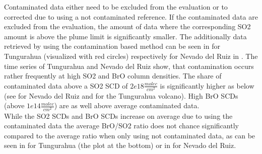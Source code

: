 \documentclass  [
  paper    = a4,
  BCOR     = 10mm,
  twoside,
  fontsize = 12pt,
  fleqn,
  toc      = bibnumbered,
  toc      = listofnumbered,
  numbers  = noendperiod,
  headings = normal,
  listof   = leveldown,
  version  = 3.03
]                                       {scrreprt}
\begin{document}
	Contaminated data either need to be excluded from the evaluation or to corrected due to using a not contaminated reference. If the contaminated data are excluded from the evaluation, the amount of data where the corresponding SO2 amount is above the plume limit is significantly smaller. The additionally data retrieved by using the contamination based method can be seen in  for Tungurahua (visualized with red circles) respectively for Nevado del Ruiz in .
	The time series of Tungurahua and Nevado del Ruiz show, that contamination occurs rather frequently at high SO2 and BrO column densities. The share of contaminated data above a SO2 SCD of $2e18\frac{molec}{cm^2}$ is significantly higher as below (see  for Nevado del Ruiz and  for the Tungurahua volcano). High BrO SCDs (above $1e14\frac{molec}{cm^2}$) are as well above average contaminated data.\\
	While the SO2 SCDs and BrO SCDs increase on average due to using the contaminated data the average BrO/SO2 ratio does not chance significantly compared to the average ratio when only using not contaminated data, as can be seen in  for Tungurahua (the plot at the bottom) or in  for Nevado del Ruiz.\\

	
	
\end{document}
